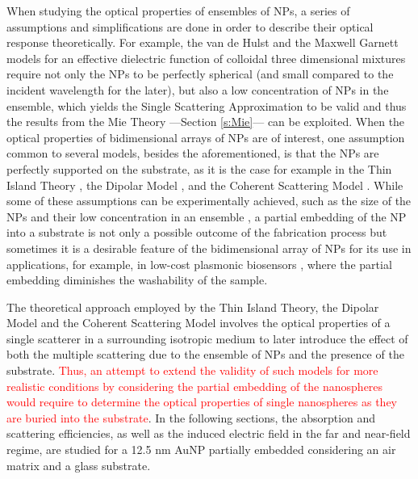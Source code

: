
When studying the optical properties of ensembles of NPs, a series of assumptions and simplifications are done in order to describe their optical response theoretically. For example, the van de Hulst  \cite{hulst_light_1981} and the Maxwell Garnett \cite{sihvola_electromagnetic_2008} models for an effective dielectric function of colloidal three dimensional mixtures require not only the NPs to be perfectly spherical (and small compared to the incident wavelength for the later), but also a low concentration of NPs in the ensemble, which yields the Single Scattering Approximation to be valid and thus the results from the Mie Theory ---Section \ref{s:Mie}--- can be exploited. When the optical properties of bidimensional arrays of NPs are of interest, one assumption common to several models, besides the aforementioned, is that the NPs are  perfectly supported on the substrate, as it is the case for example in the Thin Island Theory \cite{bedeaux_optical_2004}, the Dipolar Model \cite{barrera1991optical}, and the Coherent Scattering Model \cite{garcia2012multiple}. While some of these assumptions can be experimentally achieved, such as the size of the NPs and their low concentration in an ensemble \cite{reyes2022enhancement}, a partial embedding of the NP into a substrate is not only a possible outcome of the fabrication process \cite{meng_anisotropic_2015} but sometimes it is a desirable feature of the bidimensional array of NPs for its use in applications, for example, in low-cost plasmonic biosensors \cite{moirangthem_enhanced_2012}, where the partial embedding diminishes the washability of the sample.

The theoretical approach employed by the Thin Island Theory, the Dipolar Model and the Coherent Scattering Model involves the optical properties of a single scatterer in a surrounding isotropic medium to later introduce the effect of both the multiple scattering due to the ensemble of NPs and the presence of the substrate. \textcolor{red}{Thus, an attempt to extend the validity  of such models for more realistic conditions by considering the partial embedding of the nanospheres would require to determine the optical properties of single nanospheres as they are buried into the substrate}. In the following sections, the absorption and scattering efficiencies, as well as the induced electric field in the far and near-field regime, are studied for a 12.5 nm AuNP partially embedded considering an air matrix and a glass substrate.
